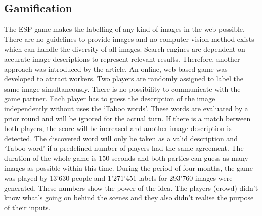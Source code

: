 \subsection{Gamification}
The ESP game\cite{esp} makes the labelling of any kind of images in the web possible. There are no guidelines to provide images and no computer vision method exists which can handle the diversity of all images. Search engines are dependent on accurate image descriptions to represent relevant results. Therefore, another approach was introduced by the article. An online, web-based game was developed to attract workers. Two players are randomly assigned to label the same image simultaneously. There is no possibility to communicate with the game partner. Each player has to guess the description of the image independently without uses the `Taboo words'. These words are evaluated by a prior round and will be ignored for the actual turn. If there is a match between both players, the score will be increased and another image description is detected. The discovered word will only be taken as a valid description and `Taboo word' if a predefined number of players had the same agreement. The duration of the whole game is 150 seconds and both parties can guess as many images as possible within this time. 
During the period of four months, the game was played by 13'630 people and 1'271'451 labels for 293'760 images were generated. These numbers show the power of the idea. The players (crowd) didn't know what's going on behind the scenes and they also didn't realise the purpose of their inputs.

